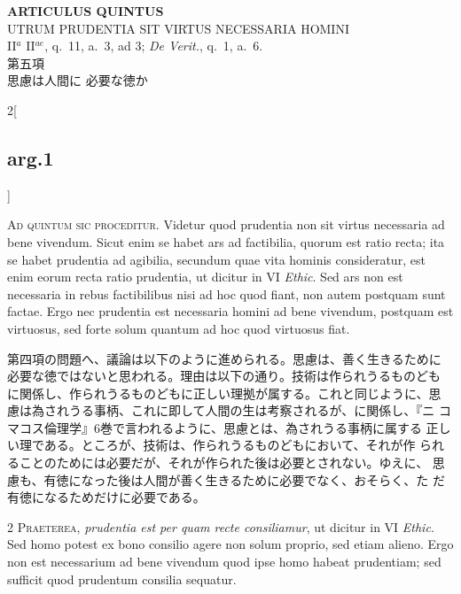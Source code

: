 \documentclass[paper=a4paper,fontsize=10pt,jafontsize=9pt,titlepage]{jlreq}
\begin{document}
{}
\setcounter{section}{5}
\setcounter{subsection}{0}
\begin{center}
 {\Large {\bfseries ARTICULUS QUINTUS}}\\ {\large UTRUM PRUDENTIA SIT VIRTUS
 NECESSARIA HOMINI}\\ {\footnotesize II$^a$ II$^{ae}$, q.~11, a.~3, ad
 3; {\itshape De Verit.}, q.~1, a.~6.}\\ {\Large 第五項\\思慮は人間に
 必要な徳か}
\end{center}

\begin{paracol}{2}[\subsection{arg.1}]

{\huge A}{\scshape d quintum sic proceditur}. Videtur quod prudentia
 non sit virtus necessaria ad bene vivendum. Sicut enim se habet ars
 ad factibilia, quorum est ratio recta; ita se habet prudentia ad
 agibilia, secundum quae vita hominis consideratur, est enim eorum
 recta ratio prudentia, ut dicitur in VI {\itshape Ethic}. Sed ars non
 est necessaria in rebus factibilibus nisi ad hoc quod fiant, non
 autem postquam sunt factae. Ergo nec prudentia est necessaria homini
 ad bene vivendum, postquam est virtuosus, sed forte solum quantum ad
 hoc quod virtuosus fiat.

\switchcolumn

第四項の問題へ、議論は以下のように進められる。思慮は、善く生きるために
必要な徳ではないと思われる。理由は以下の通り。技術は作られうるものども
に関係し、作られうるものどもに正しい理拠が属する。これと同じように、思
慮は為されうる事柄、これに即して人間の生は考察されるが、に関係し、『ニ
コマコス倫理学』6巻で言われるように、思慮とは、為されうる事柄に属する
正しい理である。ところが、技術は、作られうるものどもにおいて、それが作
られることのためには必要だが、それが作られた後は必要とされない。ゆえに、
思慮も、有徳になった後は人間が善く生きるために必要でなく、おそらく、た
だ有徳になるためだけに必要である。


{\scshape 2 Praeterea}, {\itshape prudentia est per quam recte
 consiliamur}, ut dicitur in VI {\itshape Ethic}. Sed homo potest ex
 bono consilio agere non solum proprio, sed etiam alieno. Ergo non est
 necessarium ad bene vivendum quod ipse homo habeat prudentiam; sed
 sufficit quod prudentum consilia sequatur.


\end{paracol}
\end{document}
